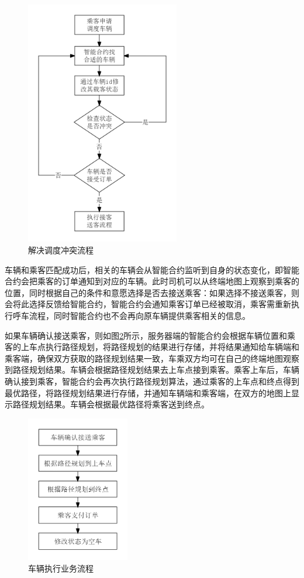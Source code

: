 \begin{figure}[h]
  \centering
  \includegraphics[width=0.6\textwidth]{figures/解决调度冲突}
  \caption{解决调度冲突流程}\label{fig:conflict}
\end{figure}

车辆和乘客匹配成功后，相关的车辆会从智能合约监听到自身的状态变化，即智能合约会把乘客的订单通知到对应的车辆。此时司机可以从终端地图上观察到乘客的位置，同时根据自己的条件和意愿选择是否去接送乘客：如果选择不接送乘客，则会将此选择反馈给智能合约，智能合约会通知乘客订单已经被取消，乘客需重新执行呼车流程，同时智能合约也不会再向原车辆提供乘客相关的信息。

如果车辆确认接送乘客，则如图\ref{fig:routing}所示，服务器端的智能合约会根据车辆位置和乘客的上车点执行路径规划，将路径规划的结果进行存储，并将结果通知给车辆端和乘客端，确保双方获取的路径规划结果一致，车乘双方均可在自己的终端地图观察到路径规划结果。车辆会根据路径规划结果去上车点接到乘客。乘客上车后，车辆确认接到乘客，智能合约会再次执行路径规划算法，通过乘客的上车点和终点得到最优路径，将路径规划结果进行存储，并通知车辆端和乘客端，在双方的地图上显示路径规划结果。车辆会根据最优路径将乘客送到终点。

\begin{figure}[h]
  \centering
  \includegraphics[width=0.4\textwidth]{figures/按导航执行业务}
  \caption{车辆执行业务流程}\label{fig:routing}
\end{figure}

